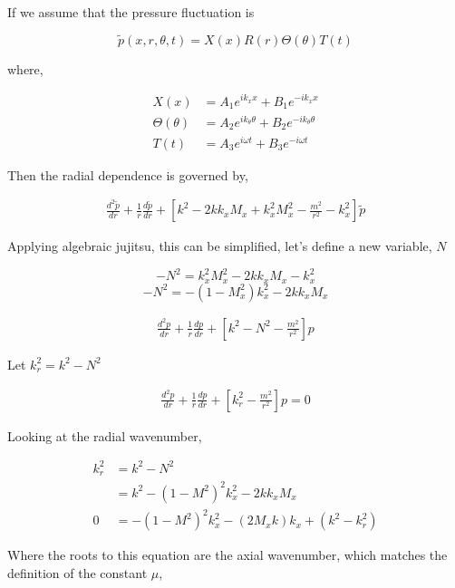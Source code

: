 \documentclass[a4paper]{article}
\begin{document}
If we assume that the pressure fluctuation is 


\begin{equation}
    \tilde{p}(x,r,\theta,t) = X(x) R(r) \Theta(\theta) T(t)
\end{equation}

where, 

\begin{align*}
    X(x) &=
    A_1 e^{ik_x x} +
    B_1 e^{-ik_x x }\\
    \Theta(\theta) &=
    A_2 e^{i k_{\theta} \theta } +
    B_2 e^{-ik_{\theta} \theta }\\
    T(t) &=
    A_3 e^{i \omega t } +
    B_3 e^{-i\omega t  }
\end{align*}

Then the radial dependence is governed by,


\begin{align*}
    \frac{ d^2 \tilde{p}}{d r} +
    \frac{1}{r} 
    \frac{d \tilde{p}}{d r} + \left[ 
    k^2 - 2 k k_x M_x + k_x^2 M_x^2- \frac{m^2}{r^2}  - k_x^2\right]\tilde{p}
\end{align*}

Applying algebraic jujitsu, this can be simplified, let's define a new variable,
$N$

$$- N^2 = k_x^2 M_x^2 - 2 k k_x M_x - k_x^2 $$
$$-N^2 = -(1 -  M_x^2)k_x^2 - 2 k k_x M_x  $$


\begin{align*}
    \frac{ d^2 p}{d r} +
    \frac{1}{r} 
    \frac{d p}{d r} + \left[ 
    k^2 - N^2 - \frac{m^2}{r^2}  \right]p 
\end{align*}

Let $k_r^2 = k^2 - N^2$


\begin{align*}
    \frac{ d^2 p}{d r} +
    \frac{1}{r} 
    \frac{d p}{d r} + \left[ 
    k_r^2  - \frac{m^2}{r^2}  \right]p = 0
\end{align*}

Looking at the radial wavenumber,

\begin{align*}
    k_r^2 &= k^2 - N^2 \\
          &= k^2-(1 - M^2)^2 k_x^2 - 2 k k_x M_x \\
    0 &=  -(1 - M^2) ^2 k_x ^2 -  \left( 2M_x k \right)k_x +(k^2 - k_r^2)
\end{align*}

Where the roots to this equation are the axial wavenumber, which matches
the definition of the constant $\mu$,
\end{document}
